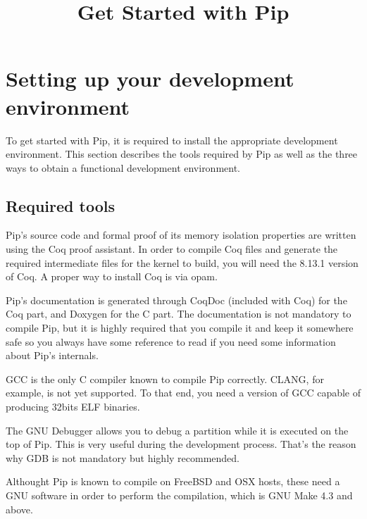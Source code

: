\documentclass[10pt,a4paper,titlepage]{refart}
\title{Get Started with Pip}
\begin{document}
\maketitle

\tableofcontents

\pagebreak

\section{Setting up your development environment}

To get started with Pip, it is required to install the appropriate development
environment. This section describes the tools required by Pip as well as the
three ways to obtain a functional development environment.

\subsection{Required tools}

 
Pip's source code and formal proof of its memory isolation properties are
written using the Coq proof assistant. In order to compile Coq files and
generate the required intermediate files for the kernel to build, you will need
the 8.13.1 version of Coq. A proper way to install Coq is via opam.

 
Pip's documentation is generated through CoqDoc (included with Coq) for the Coq
part, and Doxygen for the C part. The documentation is not mandatory to compile
Pip, but it is highly required that you compile it and keep it somewhere safe so
you always have some reference to read if you need some information about Pip's
internals.

 
GCC is the only C compiler known to compile Pip correctly. CLANG, for example,
is not yet supported. To that end, you need a version of GCC capable of
producing 32bits ELF binaries.

 
The GNU Debugger allows you to debug a partition while it is executed on the
top of Pip. This is very useful during the development process. That's the
reason why GDB is not mandatory but highly recommended.

 
Althought Pip is known to compile on FreeBSD and OSX hosts, these need a GNU
software in order to perform the compilation, which is GNU Make 4.3 and above.
\end{document}
